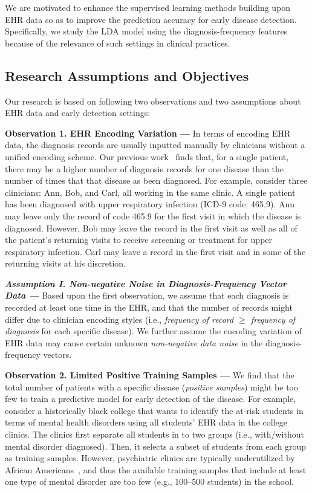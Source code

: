 We are motivated to enhance the supervised learning methods building upon EHR data so as to improve the prediction accuracy for early disease detection.
Specifically, we study the LDA model using the diagnosis-frequency features because of the relevance of such settings in clinical practices.
 

\subsection{Research Assumptions and Objectives}

Our research is based on following two observations and two assumptions about EHR data and early detection settings:

\textbf{Observation 1. EHR Encoding Variation --- } 
In terms of encoding EHR data, the diagnosis records are usually inputted manually by clinicians without a unified encoding scheme.
Our previous work~\cite{FIXME} finds that, for a single patient, there may be a higher number of diagnosis records for one disease than the number of times that that disease as been diagnosed.
For example, consider three clinicians: Ann, Bob, and Carl, all working in the same clinic.
A single patient has been diagnosed with upper respiratory infection (ICD-9 code: 465.9).  
Ann may leave only the record of code 465.9 for the first visit in which the disease is diagnosed.
However, Bob may leave the record in the first visit as well as all of the patient's returning visits to receive screening or treatment for upper respiratory infection.
Carl may leave a record in the first visit and in some of the returning visits at his discretion.

\textbf{\em Assumption I. Non-negative Noise in Diagnosis-Frequency Vector Data --- } 
Based upon the first observation, we assume that each diagnosis is recorded at least one time in the EHR, and that the number of records might differ due to clinician encoding styles (i.e., \emph{frequency of record $\geq$ frequency of diagnosis} for each specific disease).
We further assume the encoding variation of EHR data may cause certain unknown \emph{non-negative data noise} in the diagnosis-frequency vectors.
 

\textbf{Observation 2. Limited Positive Training Samples --- } 
We find that the total number of patients with a specific disease (\emph{positive samples}) might be too few to train a predictive model for early detection of the disease.
For example, consider a historically black college that wants to identify the at-risk students in terms of mental health disorders using all students' EHR data in the college clinics.
The clinics first separate all students in to two groups (i.e., with/without mental disorder diagnosed).  Then, it selects a subset of students from each group as training samples.
However, psychiatric clinics are typically underutilized by African Americans~\cite{FIXME}, and thus the available training samples that include at least one type of mental disorder are too few (e.g., 100--500 students) in the school.


